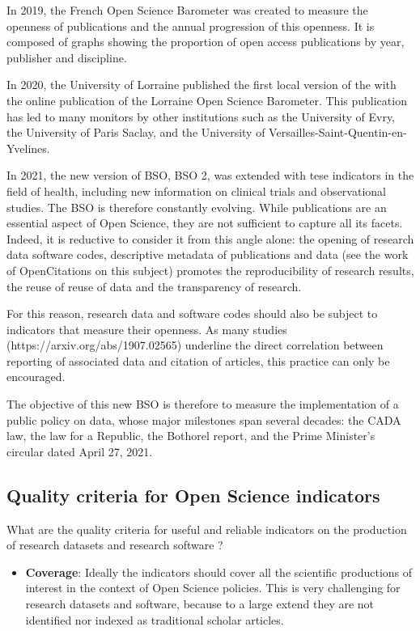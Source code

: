 \documentclass[
]{article}
\providecommand{\tightlist}{%
  \setlength{\itemsep}{0pt}\setlength{\parskip}{0pt}}
\begin{document}
In 2019, the French Open Science Barometer was created to measure the
openness of publications and the annual progression of this openness. It
is composed of graphs showing the proportion of open access publications
by year, publisher and discipline.

In 2020, the University of Lorraine published the first local version of
the with the online publication of the Lorraine Open Science Barometer.
This publication has led to many monitors by other institutions such as
the University of Evry, the University of Paris Saclay, and the
University of Versailles-Saint-Quentin-en-Yvelines.

In 2021, the new version of BSO, BSO 2, was extended with tese
indicators in the field of health, including new information on clinical
trials and observational studies. The BSO is therefore constantly
evolving. While publications are an essential aspect of Open Science,
they are not sufficient to capture all its facets. Indeed, it is
reductive to consider it from this angle alone: the opening of research
data software codes, descriptive metadata of publications and data (see
the work of OpenCitations on this subject) promotes the reproducibility
of research results, the reuse of reuse of data and the transparency of
research.

For this reason, research data and software codes should also be subject
to indicators that measure their openness. As many studies
(https://arxiv.org/abs/1907.02565) underline the direct correlation
between reporting of associated data and citation of articles, this
practice can only be encouraged.

The objective of this new BSO is therefore to measure the implementation
of a public policy on data, whose major milestones span several decades:
the CADA law, the law for a Republic, the Bothorel report, and the Prime
Minister's circular dated April 27, 2021.

\hypertarget{quality-criteria-for-open-science-indicators}{%
\subsection{Quality criteria for Open Science
indicators}\label{quality-criteria-for-open-science-indicators}}

What are the quality criteria for useful and reliable indicators on the
production of research datasets and research software ?

\begin{itemize}
\tightlist
\item
  \textbf{Coverage}: Ideally the indicators should cover all the
  scientific productions of interest in the context of Open Science
  policies. This is very challenging for research datasets and software,
  because to a large extend they are not identified nor indexed as
  traditional scholar articles.
\end{itemize}
\end{document}

